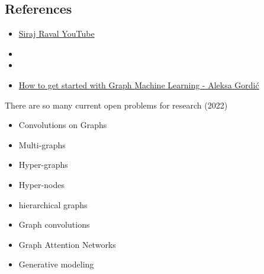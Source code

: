 \subsection{References}
\begin{itemize}
	\item \href{https://youtu.be/bA261BF0bdk}{Siraj Raval YouTube}
	\item {}
	\item {}
	\item \href{https://gordicaleksa.medium.com/how-to-get-started-with-graph-machine-learning-afa53f6f963a}{How to get started with Graph Machine Learning - Aleksa Gordić}
\end{itemize}

There are so many current open problems for research (2022)
\begin{itemize}
	\item Convolutions on Graphs \cite{daigavane2021understanding}
	\item Multi-graphs
	\item Hyper-graphs
	\item Hyper-nodes
	\item hierarchical graphs
	\item Graph convolutions
	\item Graph Attention Networks
	\item Generative modeling
\end{itemize}